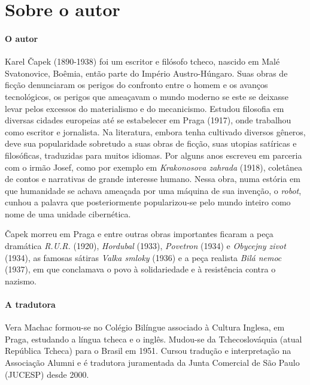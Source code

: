 \documentclass[11pt]{extarticle}
\begin{document}

\section{Sobre o autor}

\paragraph{O autor} Karel Čapek (1890-1938) foi um escritor e filósofo tcheco, nascido em Malé Svatonovice, Boêmia, então parte do Império Austro-Húngaro. Suas obras de ficção denunciaram os perigos do confronto entre o homem e os avanços tecnológicos, os perigos que ameaçavam o mundo moderno se este se deixasse levar pelos excessos do materialismo e do mecanicismo. Estudou filosofia em diversas cidades europeias até se estabelecer em Praga (1917), onde trabalhou como escritor e jornalista. Na literatura, embora tenha cultivado diversos gêneros, deve sua popularidade sobretudo a suas obras de ficção, suas utopias satíricas e filosóficas, traduzidas para muitos idiomas. Por alguns anos escreveu em parceria com o irmão Josef, como por exemplo em \textit{Krakonosova zahrada} (1918), coletânea de contos e narrativas de grande interesse humano. Nessa obra, numa estória em que humanidade se achava ameaçada por uma máquina de sua invenção, o \textit{robot}, cunhou a palavra que posteriormente popularizou-se pelo mundo inteiro como nome de uma unidade cibernética. 

Čapek morreu em Praga e entre outras obras importantes ficaram a peça dramática \textit{R.U.R.} (1920), \textit{Hordubal} (1933), \textit{Povetron} (1934) e \textit{Obycejny zivot} (1934), as famosas sátiras \textit{Valka smloky} (1936) e a peça realista \textit{Bilá nemoc} (1937), em que conclamava o povo à solidariedade e à resistência contra o nazismo.

\paragraph{A tradutora} Vera Machac formou-se no Colégio Bilíngue associado à Cultura Inglesa, em Praga, estudando a língua tcheca e o inglês. Mudou-se da Tchecoslováquia (atual República Tcheca) para o Brasil em 1951. Cursou tradução e interpretação na Associação Alumni e é tradutora juramentada da Junta Comercial de São Paulo (JUCESP) desde 2000.  
\end{document}
